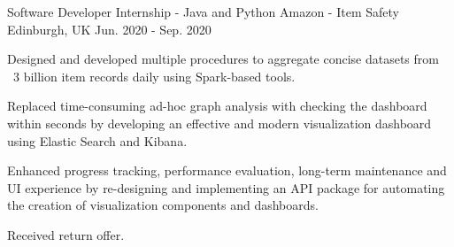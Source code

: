 \begin{cventries}
  \cventry
    {Software Developer Internship - Java and Python} %
    {Amazon - Item Safety} %
    {Edinburgh, UK} %
    {Jun. 2020 - Sep. 2020} %
    {
      \begin{cvitems} %
        \item {Designed and developed multiple procedures to aggregate concise datasets from ~3 billion item records daily using Spark-based tools.}
        \item {Replaced time-consuming ad-hoc graph analysis with checking the dashboard within seconds by developing an effective and modern visualization dashboard using Elastic Search and Kibana.}
        \item {Enhanced progress tracking, performance evaluation, long-term maintenance and UI experience by re-designing and implementing an API package for automating the creation of visualization components and dashboards.}
        \item {Received return offer.}
      \end{cvitems}
    }


\end{cventries}
